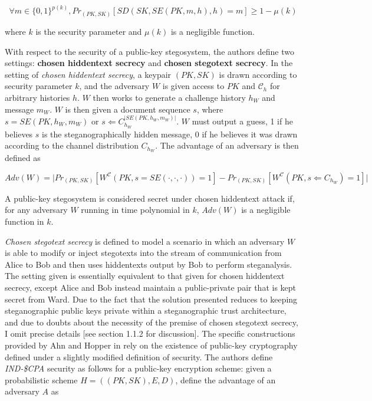\documentclass{article}
\begin{document}
\[ \forall m \in \{0,1\}^{p(k)}, Pr_{(PK,SK)}[SD(SK,SE(PK,m,h),h) = m ] \geq 1 - \mu(k) \]

\noindent where $k$ is the security parameter and $\mu(k)$ is a negligible function.

With respect to the security of a public-key stegosystem, the authors define two settings: \textbf{chosen hiddentext secrecy} and 
\textbf{chosen stegotext secrecy}.  In the setting of \textit{chosen hiddentext secrecy}, a keypair $(PK, SK)$ is drawn according to 
security parameter $k$, and the adversary $W$ is given access to $PK$ and $\mathcal{C}_h$ for arbitrary histories $h$.  $W$ then works to 
generate a challenge history $h_W$ and message $m_W$.  $W$ is then given a document sequence $s$, where $s = SE(PK,h_W,m_W)$ or 
$s \Leftarrow C_{h_W}^{\lvert SE(PK,h_W, m_W) \rvert}$. $W$ must output a guess, 1 if he believes $s$ is the steganographically hidden 
message, 0 if he believes it was drawn according to the channel distribution $C_{h_W}$.  The advantage of an adversary is then defined as

\[ Adv(W) =  \lvert Pr_{(PK,SK)}[W^{\mathcal{C}}(PK,s=SE(\cdot,\cdot,\cdot)) = 1] - Pr_{(PK,SK)}[W^{\mathcal{C}}(PK,s \Leftarrow C_{h_W}) = 1] \rvert \]

\noindent A public-key stegosystem is considered secret under chosen hiddentext attack if, for any adversary $W$ running in time polynomial in $k$,
$Adv(W)$ is a negligible function in $k$.

\textit{Chosen stegotext secrecy} is defined to model a scenario in which an adversary $W$ is able to modify or inject stegotexts into 
the stream of communication from Alice to Bob and then uses hiddentexts output by Bob to perform steganalysis.  The setting given is essentially 
equivalent to that given for chosen hiddentext secrecy, except Alice and Bob instead maintain a public-private pair that is kept secret from Ward.
Due to the fact that the solution presented reduces to keeping steganographic public keys private within a steganographic trust architecture, and due to 
doubts about the necessity of the premise of chosen stegotext secrecy, I omit precise details [see section 1.1.2 for discussion].
\newline\newline
The specific constructions provided by Ahn and Hopper in \cite{BiglouPubKey} rely on the existence of public-key cryptography 
defined under a slightly modified definition of security.  The authors define \textit{IND-\$CPA} security as follows for a 
public-key encryption scheme: given a probabilistic scheme $H = ((PK,SK), E, D)$, define the advantage of an adversary 
$A$ as
\end{document}

